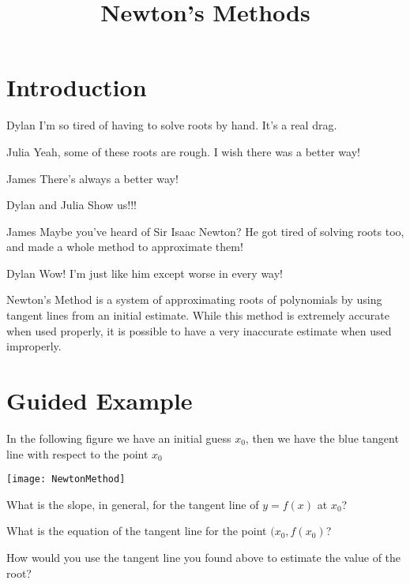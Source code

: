 \documentclass{ximera}
\title{Newton's Methods}
\begin{document}
\maketitle
\section{Introduction}
\begin{dialogue}
\item[Dylan] I'm so tired of having to solve roots by hand. It's a real drag.
\item[Julia] Yeah, some of these roots are rough. I wish there was a better way!
\item[James] There's always a better way!
\item[Dylan and Julia] Show us!!!
\item[James] Maybe you've heard of Sir Isaac Newton? He got tired of solving roots too, and made a whole method to approximate them!
\item[Dylan] Wow! I'm just like him except worse in every way!
\end{dialogue}
Newton's Method is a system of approximating roots of polynomials by using tangent lines from an initial estimate. While this method is extremely accurate when used properly, it is possible to have a very inaccurate estimate when used improperly.
\section{Guided Example}
In the following figure we have an initial guess $x_{0}$, then we have the blue tangent line with respect to the point $x_{0}$
\begin{image}
\texttt{[image: NewtonMethod]}
\end{image}
\begin{question}

What is the slope, in general, for the tangent line of $y=f(x)$ at $x_{0}$?

\begin{multipleChoice}
\end{multipleChoice}

What is the equation of the tangent line for the point $(x_{0},f(x_{0})$?

\begin{multipleChoice}
\end{multipleChoice}

How would you use the tangent line you found above to estimate the value of the root?

\begin{multipleChoice}
\end{multipleChoice}

\end{question}
\end{document}
